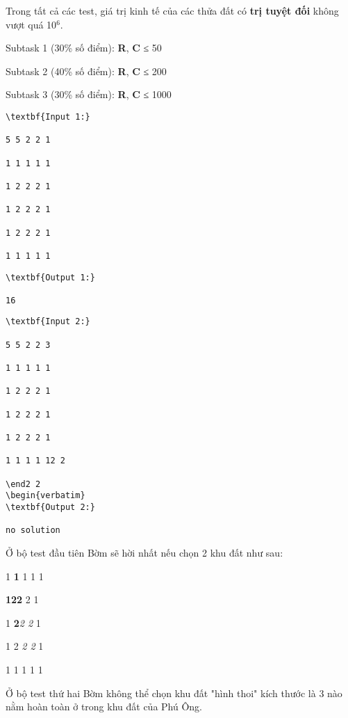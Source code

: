 Trong tất cả các test, giá trị kinh tế của các thửa đất có \textbf{trị tuyệt đối} không vượt quá 10$^6$.

Subtask 1 (30\% số điểm): \textbf{R}, \textbf{C} ≤ 50

Subtask 2 (40\% số điểm): \textbf{R}, \textbf{C} ≤ 200

Subtask 3 (30\% số điểm): \textbf{R}, \textbf{C} ≤ 1000
\begin{verbatim}
\textbf{Input 1:}

5 5 2 2 1

1 1 1 1 1

1 2 2 2 1

1 2 2 2 1

1 2 2 2 1

1 1 1 1 1

\end{verbatim}
\begin{verbatim}
\textbf{Output 1:}

16

\end{verbatim}
\begin{verbatim}
\textbf{Input 2:}

5 5 2 2 3

1 1 1 1 1

1 2 2 2 1

1 2 2 2 1

1 2 2 2 1

1 1 1 1 12 2

\end2 2
\begin{verbatim}
\textbf{Output 2:}

no solution

\end{verbatim}
Ở bộ test đầu tiên Bờm sẽ hời nhất nếu chọn 2 khu đất như sau:

1 \textbf{1} 1 1 1

\textbf{1}\textbf{2}\textbf{2} 2 1

1 \textbf{2}\emph{2 2} 1

1 2 \emph{2 2} 1

1 1 1 1 1

Ở bộ test thứ hai Bờm không thể chọn khu đất "hình thoi" kích thước là 3 nào nằm hoàn toàn ở trong khu đất của Phú Ông.